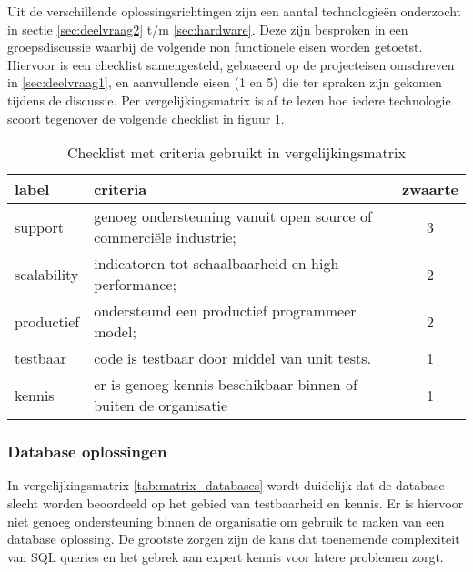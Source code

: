 Uit de verschillende oplossingsrichtingen zijn een aantal technologieën onderzocht in sectie \ref{sec:deelvraag2} t/m \ref{sec:hardware}. Deze zijn besproken in een groepsdiscussie waarbij de volgende non functionele eisen worden getoetst. Hiervoor is een checklist samengesteld, gebaseerd op de projecteisen omschreven in \ref{sec:deelvraag1}, en aanvullende eisen (1 en 5) die ter spraken zijn gekomen tijdens de discussie. Per vergelijkingsmatrix is af te lezen hoe iedere technologie scoort tegenover de volgende checklist in figuur \ref{tab:checklist}.

\begin{table}[h]
\centering
\caption{Checklist met criteria gebruikt in vergelijkingsmatrix}
\label{tab:checklist}
\def\arraystretch{1.2}
\begin{tabular}{l|p{11cm}c}
label       & criteria                                                          & zwaarte \\ \hline
support     & genoeg ondersteuning vanuit open source of commerciële industrie; & 3       \\
scalability & indicatoren tot schaalbaarheid en high performance;               & 2       \\
productief  & ondersteund een productief programmeer model;                     & 2       \\
testbaar    & code is testbaar door middel van unit tests.                      & 1       \\
kennis      & er is genoeg kennis beschikbaar binnen of buiten de organisatie   & 1      
\end{tabular}
\end{table}

\subsubsection{\textbf{Database oplossingen}}

In vergelijkingsmatrix \ref{tab:matrix_databases} wordt duidelijk dat de database slecht worden beoordeeld op het gebied van testbaarheid en kennis. Er is hiervoor niet genoeg ondersteuning binnen de organisatie om gebruik te maken van een database oplossing. De grootste zorgen zijn de kans dat toenemende complexiteit van SQL queries en het gebrek aan expert kennis voor latere problemen zorgt.

